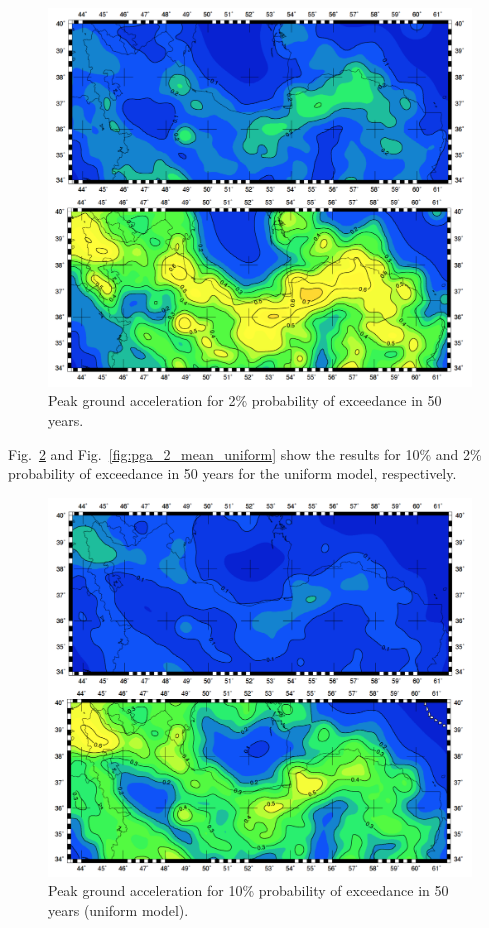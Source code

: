 \begin{figure} [!ht]
\centering
\includegraphics[scale=0.3]{figures/pdf/pga_2_mean.pdf} 
\caption{Peak ground acceleration for 2\% probability of exceedance in 50 years.}
\label{fig:pga_2_mean}
\end{figure}

Fig.~\ref{fig:pga_10_mean_uniform} and Fig.~\ref{fig:pga_2_mean_uniform} show the results for 10\% and 2\% probability of exceedance in 50 years for the uniform model, respectively.

\begin{figure} [!ht]
\centering
\includegraphics[scale=0.3]{figures/pdf/pga_10_mean_uniform.pdf} 
\caption{Peak ground acceleration for 10\% probability of exceedance in 50 years (uniform model).}
\label{fig:pga_10_mean_uniform}
\end{figure}

